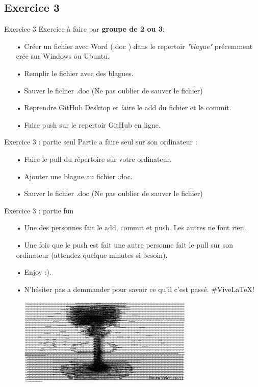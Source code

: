 \documentclass{beamer}
\begin{document}
\subsection{Exercice 3}
\begin{frame}{Exercice 3}
    Exercice à faire par \textbf{groupe de 2 ou 3}:
    \begin{itemize}
    \item[•] Créer un fichier avec Word (.doc ) dans le repertoir \textit{"blague"} précemment crée sur Windows ou Ubuntu.
    \item[•] Remplir le fichier avec des blagues.
    \item[•] Sauver le fichier .doc (Ne pas oublier de sauver le fichier)
    \item[•] Reprendre GitHub Desktop et faire le add du fichier et le commit.
    \item[•] Faire push sur le repertoir GitHub en ligne.
    \end{itemize}
\end{frame}

\begin{frame}{Exercice 3 : partie seul}
    Partie a faire seul sur son ordinateur :
    \begin{itemize}
    \item[•] Faire le pull du répertoire sur votre ordinateur.
    \item[•] Ajouter une blague au fichier .doc.
    \item[•] Sauver le fichier .doc (Ne pas oublier de sauver le fichier)
    \end{itemize}
\end{frame}

\begin{frame}{Exercice 3 : partie fun}
    \begin{itemize}
    \item[•] Une des personnes fait le add, commit et push. Les autres ne font rien.
    \item[•] Une fois que le push est fait une autre personne fait le pull sur son ordinateur (attendez quelque minutes si besoin).
    \item[•] Enjoy :). 
    \item[•] N'hésiter pas a demmander pour savoir ce qu'il c'est passé. \#ViveLaTeX!
    \end{itemize}
    \begin{figure}
    \centering
    \includegraphics[scale=0.5]{img/image_exercices/explosion.jpeg}
    \end{figure}
\end{frame}
\end{document}

